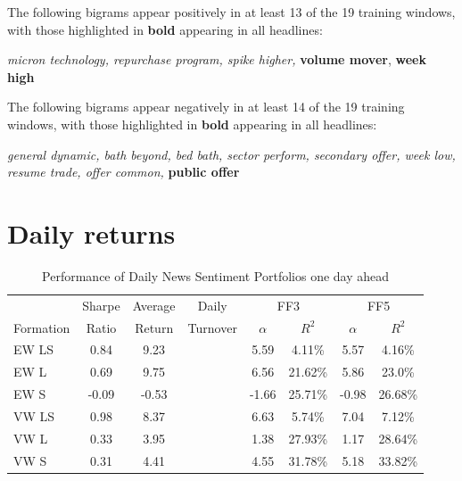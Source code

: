 The following bigrams appear positively in at least 13 of the 19 training windows, with those highlighted in \textbf{bold} appearing in all headlines:
\begin{center}
\textit{micron technology, repurchase program, spike higher,} \textbf{volume mover}, \textbf{week high}
\end{center}

The following bigrams appear negatively in at least 14 of the 19 training windows, with those highlighted in \textbf{bold} appearing in all headlines:
\begin{center}
      \textit{general dynamic, bath beyond, bed bath, sector perform, secondary offer, week low, resume trade, offer common,} \textbf{public offer}
\end{center}



\section{Daily returns}


\begin{table}[!ht]
\begin{center}
\begin{tabular}{lccccccc}
      \toprule
      & Sharpe &  Average & Daily & \multicolumn{2}{c}{FF3} & \multicolumn{2}{c}{FF5} \\
      \cmidrule(lr){5-6}
      \cmidrule(lr){7-8}
      Formation & Ratio & Return & Turnover & $\alpha$ & $R^2$ & $\alpha$ & $R^2$ \\
      \midrule
      EW LS & 0.84 & 9.23 & & 5.59 & 4.11\% & 5.57 & 4.16\% \\
      EW L & 0.69 & 9.75 & & 6.56 & 21.62\% & 5.86 & 23.0\% \\
      EW S & -0.09 & -0.53 & & -1.66 & 25.71\% & -0.98 & 26.68\% \\
      VW LS & 0.98 & 8.37 & & 6.63 & 5.74\% & 7.04 & 7.12\% \\
      VW L & 0.33 & 3.95 & & 1.38 & 27.93\% & 1.17 & 28.64\% \\
      VW S & 0.31 & 4.41 & & 4.55 & 31.78\% & 5.18 & 33.82\% \\
      \bottomrule
\end{tabular}
\caption{Performance of Daily News Sentiment Portfolios one day ahead}
\label{portfolio-performance}
\end{center}
\end{table}

